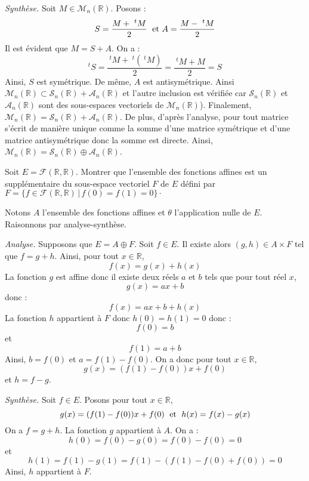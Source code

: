\documentclass[a4paper,10pt]{report}
\begin{document}
\medskip

\noindent \textit{Synthèse.} Soit $M \in \mathcal{M}_n(\mathbb{R})$. Posons : 
$$ S = \dfrac{M + ~^t M}{2} \; \hbox{ et } A = \dfrac{M-~^tM}{2}$$
Il est évident que $M=S+A$. On a :
$$ ^t{} S = \dfrac{~^t M + ~^t(~^t M)}{2} = \dfrac{~^t M + M}{2} = S$$
Ainsi, $S$ est symétrique. De même, $A$ est antisymétrique.
 Ainsi $\mathcal{M}_n(\mathbb{R}) \subset \mathcal{S}_n(\mathbb{R}) + \mathcal{A}_n(\mathbb{R})$ et l'autre inclusion est vérifiée car $\mathcal{S}_n(\mathbb{R})$ et $\mathcal{A}_n(\mathbb{R})$ sont des sous-espaces vectoriels de $\mathcal{M}_n(\mathbb{R})$). Finalement, $\mathcal{M}_n(\mathbb{R}) = \mathcal{S}_n(\mathbb{R}) + \mathcal{A}_n(\mathbb{R})$. De plus, d'après l'analyse, pour tout matrice s'écrit de manière unique comme la somme d'une matrice symétrique et d'une matrice antisymétrique donc la somme est directe. Ainsi, $\mathcal{M}_n(\mathbb{R})= \mathcal{S}_n(\mathbb{R}) \oplus \mathcal{A}_n(\mathbb{R})$.
 
\medskip


\begin{Exa} Soit $E = \mathcal{F}(\mathbb{R}, \mathbb{R})$. Montrer que l'ensemble des fonctions affines est un supplémentaire du sous-espace vectoriel $F$ de $E$ défini par $F = \lbrace f \in \mathcal{F}(\mathbb{R}, \mathbb{R}) \, \vert \, f(0)=f(1)=0 \rbrace\cdot$
\end{Exa}

\corr Notons $A$ l'ensemble des fonctions affines et $\theta$ l'application nulle de $E$. Raisonnons par analyse-synthèse.

\medskip

\noindent \textit{Analyse.} Supposons que $E = A \oplus F$. Soit $f \in E$. Il existe alors $(g,h) \in A \times F$ tel que $f=g+h$. Ainsi, pour tout $x \in \mathbb{R}$,
$$ f(x) =g(x)+h(x)$$
La fonction $g$ est affine donc il existe deux réels $a$ et $b$ tels que pour tout réel $x$,
$$ g(x) = ax+b$$
donc :
$$ f(x) = ax+b + h(x)$$
La fonction $h$ appartient à $F$ donc $h(0)=h(1)=0$ donc :
$$ f(0) = b$$
et 
$$ f(1) = a+b$$
Ainsi, $b=f(0)$ et $a=f(1)-f(0)$. On a donc pour tout $x \in \mathbb{R}$,
$$ g(x) = (f(1)-f(0))x + f(0)$$
et $h=f-g$.

\medskip

\noindent \textit{Synthèse.} Soit $f \in E$. Posons pour tout $x \in \mathbb{R}$,
$$ g(x) = (f(1)-f(0))x + f(0) \; \hbox{ et } \; h(x)=f(x)-g(x)$$
On a $f=g+h$. La fonction $g$ appartient à $A$. On a :
$$ h(0) = f(0)-g(0) = f(0)-f(0)=0$$
et
$$ h(1) = f(1)-g(1) = f(1)- (f(1)-f(0)+f(0))= 0$$
Ainsi, $h$ appartient à $F$.
\end{document}
